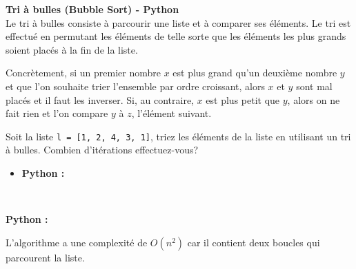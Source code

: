 \begin{Exercice} [20 minutes] \textbf{Tri à bulles (Bubble Sort) - Python \optionnel} \\
    Le tri à bulles consiste à parcourir une liste et à comparer ses éléments. Le tri est effectué en permutant les éléments de telle sorte que les éléments les plus grands soient placés à la fin de la liste. 
    
    Concrètement, si un premier nombre $x$ est plus grand qu'un deuxième  nombre $y$ et que l'on souhaite trier l'ensemble par ordre croissant, alors $x$ et $y$ sont mal placés et il faut les inverser. Si, au contraire, $x$ est plus petit que $y$, alors on ne fait rien et l'on compare $y$ à $z$, l'élément suivant.
    
    Soit la liste \lstinline{l = [1, 2, 4, 3, 1]}, triez les éléments de la liste en utilisant un tri à bulles. Combien d'itérations effectuez-vous?
    
    \begin{itemize}
            \item \textbf{Python :}
                 
        \end{itemize}
       
        \ \\
        
        \begin{solution}
        \textbf{Python :}
        
    
        L'algorithme a une complexité de $O(n^2)$ car il contient deux boucles qui parcourent la liste.\\\\\\
                
    \end{solution}
    \end{Exercice}






